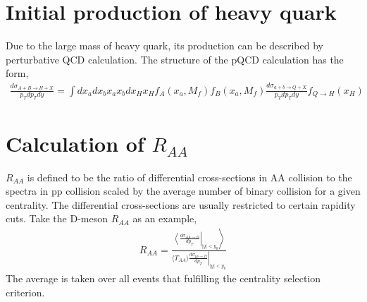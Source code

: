 \documentclass[10pt,a4paper]{article}
\newcommand{\Raa}{R_{AA}}
\begin{document}
\section{Initial production of heavy quark}
Due to the large mass of heavy quark, its production can be described by perturbative QCD calculation.
The structure of the pQCD calculation has the form,
\begin{eqnarray}
	\frac{d\sigma_{A + B \rightarrow H + X}}{p_T d{p_T} dy} = \int d x_a d x_b x_a x_b d x_H x_H f_{A}(x_a, M_f)f_{B}(x_a, M_f)\frac{d\sigma_{a + b \rightarrow Q + X}}{p_T d{p_T} dy} f_{Q \rightarrow H}(x_H)
\end{eqnarray}

\section{Calculation of $\Raa$}
$\Raa$ is defined to be the ratio of differential cross-sections in AA collision to the spectra in pp collision scaled by the average number of binary collision for a given centrality.
The differential cross-sections are usually restricted to certain rapidity cuts.
Take the D-meson $\Raa$ as an example,
\begin{eqnarray}
\Raa = \frac{\left. \left\langle \frac{d\sigma_{AA \rightarrow D}}{dp_T} \right|_{|y|<y_0} \right\rangle}{\left. \langle T_{AA}\rangle \frac{d\sigma_{pp \rightarrow D}}{dp_T}\right|_{|y|<y_0}}
\end{eqnarray}
The average is taken over all events that fulfilling the centrality selection criterion.
\end{document}
